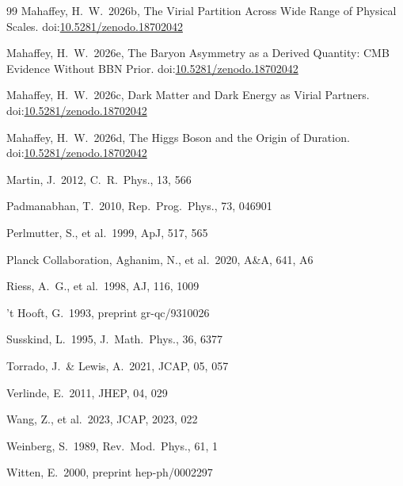 \documentclass[12pt,a4paper]{article}
\begin{document}
\begin{thebibliography}{99}
Mahaffey, H.\ W.\ 2026b, The Virial Partition Across Wide Range of
Physical Scales.
doi:\href{https://doi.org/10.5281/zenodo.18702042}{10.5281/zenodo.18702042}

Mahaffey, H.\ W.\ 2026e, The Baryon Asymmetry as a Derived Quantity:
CMB Evidence Without BBN Prior.
doi:\href{https://doi.org/10.5281/zenodo.18702042}{10.5281/zenodo.18702042}

Mahaffey, H.\ W.\ 2026c, Dark Matter and Dark Energy as Virial Partners.
doi:\href{https://doi.org/10.5281/zenodo.18702042}{10.5281/zenodo.18702042}

Mahaffey, H.\ W.\ 2026d, The Higgs Boson and the Origin of Duration.
doi:\href{https://doi.org/10.5281/zenodo.18702042}{10.5281/zenodo.18702042}

Martin, J.\ 2012, C.\ R.\ Phys., 13, 566

Padmanabhan, T.\ 2010, Rep.\ Prog.\ Phys., 73, 046901

Perlmutter, S., et al.\ 1999, ApJ, 517, 565

Planck Collaboration, Aghanim, N., et al.\ 2020, A\&A, 641, A6

Riess, A.\ G., et al.\ 1998, AJ, 116, 1009

't Hooft, G.\ 1993, preprint gr-qc/9310026

Susskind, L.\ 1995, J.\ Math.\ Phys., 36, 6377

Torrado, J.\ \& Lewis, A.\ 2021, JCAP, 05, 057

Verlinde, E.\ 2011, JHEP, 04, 029

Wang, Z., et al.\ 2023, JCAP, 2023, 022

Weinberg, S.\ 1989, Rev.\ Mod.\ Phys., 61, 1

Witten, E.\ 2000, preprint hep-ph/0002297

\end{thebibliography}
\end{document}
